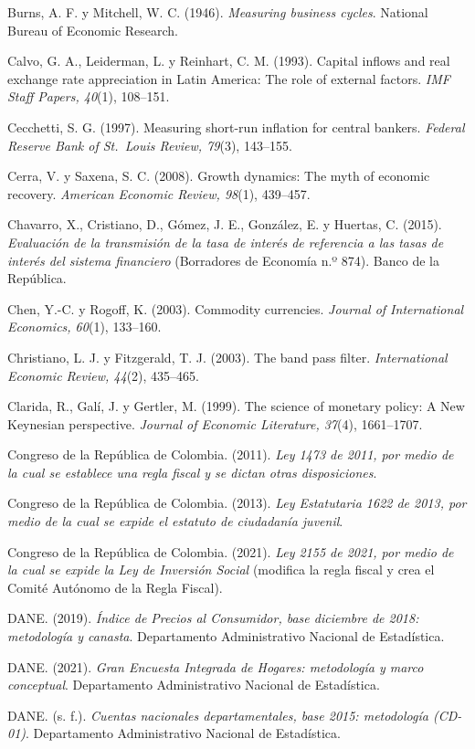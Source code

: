 Burns, A. F. y Mitchell, W. C. (1946). \emph{Measuring business cycles}.
National Bureau of Economic Research.

Calvo, G. A., Leiderman, L. y Reinhart, C. M. (1993). Capital inflows
and real exchange rate appreciation in Latin America: The role of
external factors. \emph{IMF Staff Papers, 40}(1), 108--151.

Cecchetti, S. G. (1997). Measuring short-run inflation for central
bankers. \emph{Federal Reserve Bank of St.~Louis Review, 79}(3),
143--155.

Cerra, V. y Saxena, S. C. (2008). Growth dynamics: The myth of economic
recovery. \emph{American Economic Review, 98}(1), 439--457.

Chavarro, X., Cristiano, D., Gómez, J. E., González, E. y Huertas, C.
(2015). \emph{Evaluación de la transmisión de la tasa de interés de
referencia a las tasas de interés del sistema financiero} (Borradores de
Economía n.º 874). Banco de la República.

Chen, Y.-C. y Rogoff, K. (2003). Commodity currencies. \emph{Journal of
International Economics, 60}(1), 133--160.

Christiano, L. J. y Fitzgerald, T. J. (2003). The band pass filter.
\emph{International Economic Review, 44}(2), 435--465.

Clarida, R., Galí, J. y Gertler, M. (1999). The science of monetary
policy: A New Keynesian perspective. \emph{Journal of Economic
Literature, 37}(4), 1661--1707.

Congreso de la República de Colombia. (2011). \emph{Ley 1473 de 2011,
por medio de la cual se establece una regla fiscal y se dictan otras
disposiciones}.

Congreso de la República de Colombia. (2013). \emph{Ley Estatutaria 1622
de 2013, por medio de la cual se expide el estatuto de ciudadanía
juvenil}.

Congreso de la República de Colombia. (2021). \emph{Ley 2155 de 2021,
por medio de la cual se expide la Ley de Inversión Social} (modifica la
regla fiscal y crea el Comité Autónomo de la Regla Fiscal).

DANE. (2019). \emph{Índice de Precios al Consumidor, base diciembre de
2018: metodología y canasta}. Departamento Administrativo Nacional de
Estadística.

DANE. (2021). \emph{Gran Encuesta Integrada de Hogares: metodología y
marco conceptual}. Departamento Administrativo Nacional de Estadística.

DANE. (s. f.). \emph{Cuentas nacionales departamentales, base 2015:
metodología (CD-01)}. Departamento Administrativo Nacional de
Estadística.

